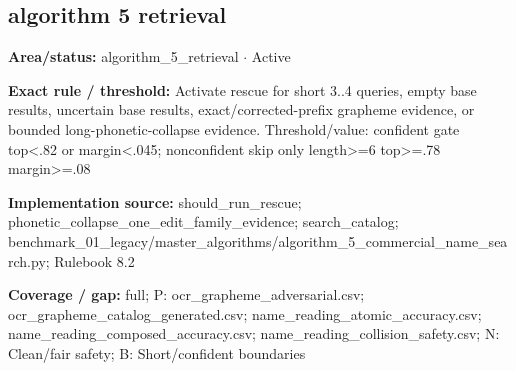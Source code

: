 \subsection*{algorithm 5 retrieval}
\begin{tcolorbox}[enhanced,breakable,colback=white,colframe=Muted!45,boxrule=0.45pt,arc=1.5pt,left=6pt,right=6pt,top=5pt,bottom=5pt,title={\texttt{A5-RESCUE-GATE-03}},title after break={\texttt{A5-RESCUE-GATE-03}\ (continued)},fonttitle=\headingfont\bfseries\color{Navy},coltitle=Navy]
\textbf{Area/status:} algorithm\_\allowbreak{}5\_\allowbreak{}retrieval $\boldsymbol{\cdot}$ Active\par
\smallskip
\textbf{Exact rule / threshold:} Activate rescue for short 3..4 queries, empty base results, uncertain base results, exact/\allowbreak{}corrected-prefix grapheme evidence, or bounded long-phonetic-collapse evidence. Threshold/\allowbreak{}value: confident gate top<.82 or margin<.045; nonconfident skip only length>=6 top>=.78 margin>=.08\par
\smallskip
\textbf{Implementation source:} should\_\allowbreak{}run\_\allowbreak{}rescue; phonetic\_\allowbreak{}collapse\_\allowbreak{}one\_\allowbreak{}edit\_\allowbreak{}family\_\allowbreak{}evidence; search\_\allowbreak{}catalog; benchmark\_\allowbreak{}01\_\allowbreak{}legacy/\allowbreak{}master\_\allowbreak{}algorithms/\allowbreak{}algorithm\_\allowbreak{}5\_\allowbreak{}commercial\_\allowbreak{}name\_\allowbreak{}search.py; Rulebook 8.2\par
\smallskip
\textbf{Coverage / gap:} full; P: ocr\_\allowbreak{}grapheme\_\allowbreak{}adversarial.csv; ocr\_\allowbreak{}grapheme\_\allowbreak{}catalog\_\allowbreak{}generated.csv; name\_\allowbreak{}reading\_\allowbreak{}atomic\_\allowbreak{}accuracy.csv; name\_\allowbreak{}reading\_\allowbreak{}composed\_\allowbreak{}accuracy.csv; name\_\allowbreak{}reading\_\allowbreak{}collision\_\allowbreak{}safety.csv; N: Clean/\allowbreak{}fair safety; B: Short/\allowbreak{}confident boundaries
\end{tcolorbox}
\medskip
